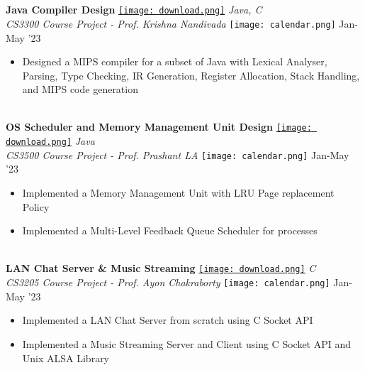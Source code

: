 \documentclass[10pt,article]{article}
\newcommand{\myMargin}{0.15in}
\newcommand{\resheading}[1]{{\small \colorbox{myblue} { \begin{minipage}{\dimexpr\linewidth-2\fboxsep}\centering{\textbf{#1 \vphantom{p\^{E}}}}\end{minipage}}}}
\newcommand{\myfont}[2]{\fontsize{#1}{#1}\selectfont #2}
\newcommand{\subheadingfont}[1]{\myfont{9pt}{#1}}
\newcommand{\projecttopic}[1]{\myfont{9pt}{\textbf{#1}}}
\newcommand{\projectdesc}[1]{\myfont{9pt}{\textcolor{projDescColor}{\textit{#1}}}}
\newcommand{\mylink}[1]{\href{#1}{\texttt{[image: download.png]}}}
\newcommand{\mycal}[1]{\texttt{[image: calendar.png]} \myfont{9}{#1}}
\begin{document}
\begin{multicols*}{2}
    
\noindent
\resheading{\subheadingfont{PROJECTS} }\\[0.1cm]

\noindent
\hrulefill \\ [-0.5cm]
\projecttopic{Java Compiler Design }
\mylink{insert link here}
\hfill    \textcolor{projDescColor}{\textit{Java, C}}  \\[0.1cm]
\projectdesc{CS3300 Course Project - Prof. Krishna Nandivada} \hfill \mycal{Jan-May '23} \\
\noindent
\vspace{-0.5cm}
\begin{itemize}[leftmargin=\myMargin]
    \item Designed a MIPS compiler for a subset of Java with Lexical Analyser, Parsing, Type Checking, IR Generation, Register Allocation, Stack Handling, and MIPS code generation
\end{itemize}
\vspace{5pt}

\noindent
\hrulefill \\ [-0.5cm]
\projecttopic{OS Scheduler and Memory Management Unit Design}
\mylink{insert link here}
\hfill    \textcolor{projDescColor}{\textit{Java}}  \\[0.1cm]
\projectdesc{CS3500 Course Project - Prof. Prashant LA} \hfill \mycal{Jan-May '23} \\
\noindent
\vspace{-0.5cm}
\begin{itemize}[leftmargin=\myMargin]
    \setlength \itemsep{-0.2em}
    \item Implemented a Memory Management Unit with LRU Page replacement Policy
    \item Implemented a Multi-Level Feedback Queue Scheduler for processes
\end{itemize}
\vspace{5pt}

\noindent
\hrulefill \\ [-0.5cm]
\projecttopic{LAN Chat Server \& Music Streaming}
\mylink{insert link here}
\hfill    \textcolor{projDescColor}{\textit{C}}  \\[0.1cm]
\projectdesc{CS3205 Course Project - Prof. Ayon Chakraborty} \hfill \mycal{Jan-May '23} \\
\noindent
\vspace{-0.5cm}
\begin{itemize}[leftmargin=\myMargin]
    \setlength \itemsep{-0.2em}
    \item Implemented a LAN Chat Server from scratch using C Socket API
    \item Implemented a Music Streaming Server and Client using C Socket API and Unix ALSA Library 
\end{itemize}
\vspace{5pt}


\end{multicols*}
\end{document}
